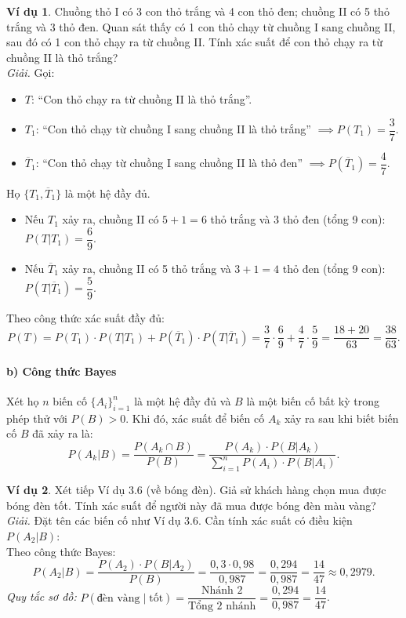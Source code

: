 \documentclass[12pt,a4paper]{article}
\theoremstyle{definition}
\newtheorem{vidu}{Ví dụ}[section]
\begin{document}
\begin{vidu}
Chuồng thỏ I có 3 con thỏ trắng và 4 con thỏ đen; chuồng II có 5 thỏ trắng và 3 thỏ đen. Quan sát thấy có 1 con thỏ chạy từ chuồng I sang chuồng II, sau đó có 1 con thỏ chạy ra từ chuồng II. Tính xác suất để con thỏ chạy ra từ chuồng II là thỏ trắng?\\
\textit{Giải.} Gọi:
\begin{itemize}
    \item $T$: ``Con thỏ chạy ra từ chuồng II là thỏ trắng''.
    \item $T_1$: ``Con thỏ chạy từ chuồng I sang chuồng II là thỏ trắng'' $\implies P(T_1) = \dfrac{3}{7}$.
    \item $\overline{T}_1$: ``Con thỏ chạy từ chuồng I sang chuồng II là thỏ đen'' $\implies P(\overline{T}_1) = \dfrac{4}{7}$.
\end{itemize}
Họ $\{T_1, \overline{T}_1\}$ là một hệ đầy đủ.
\begin{itemize}
    \item Nếu $T_1$ xảy ra, chuồng II có $5 + 1 = 6$ thỏ trắng và 3 thỏ đen (tổng 9 con): $P(T|T_1) = \dfrac{6}{9}$.
    \item Nếu $\overline{T}_1$ xảy ra, chuồng II có 5 thỏ trắng và $3 + 1 = 4$ thỏ đen (tổng 9 con): $P(T|\overline{T}_1) = \dfrac{5}{9}$.
\end{itemize}
Theo công thức xác suất đầy đủ:
\[
P(T) = P(T_1) \cdot P(T|T_1) + P(\overline{T}_1) \cdot P(T|\overline{T}_1) = \frac{3}{7} \cdot \frac{6}{9} + \frac{4}{7} \cdot \frac{5}{9} = \frac{18 + 20}{63} = \frac{38}{63}.
\]
\end{vidu}

\paragraph{b) Công thức Bayes}
Xét họ $n$ biến cố $\{A_i\}_{i=1}^n$ là một hệ đầy đủ và $B$ là một biến cố bất kỳ trong phép thử với $P(B) > 0$. Khi đó, xác suất để biến cố $A_k$ xảy ra sau khi biết biến cố $B$ đã xảy ra là:
\[
P(A_k|B) = \frac{P(A_k \cap B)}{P(B)} = \frac{P(A_k) \cdot P(B|A_k)}{\displaystyle\sum_{i=1}^n P(A_i) \cdot P(B|A_i)}.
\]

\begin{vidu}
Xét tiếp Ví dụ 3.6 (về bóng đèn). Giả sử khách hàng chọn mua được bóng đèn tốt. Tính xác suất để người này đã mua được bóng đèn màu vàng?\\
\textit{Giải.} Đặt tên các biến cố như Ví dụ 3.6. Cần tính xác suất có điều kiện $P(A_2|B)$:\\
Theo công thức Bayes:
\[
P(A_2|B) = \frac{P(A_2) \cdot P(B|A_2)}{P(B)} = \frac{0{,}3 \cdot 0{,}98}{0{,}987} = \frac{0{,}294}{0{,}987} = \frac{14}{47} \approx 0{,}2979.
\]
\textit{Quy tắc sơ đồ:} $P(\text{đèn vàng} \mid \text{tốt}) = \dfrac{\text{Nhánh 2}}{\text{Tổng 2 nhánh}} = \dfrac{0{,}294}{0{,}987} = \dfrac{14}{47}$.
\end{vidu}
\end{document}
